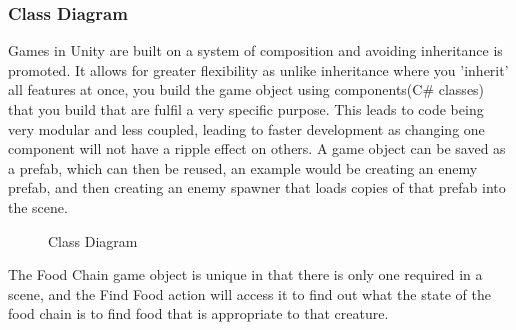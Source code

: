 \documentclass[10pt]{report}
\begin{document}
\subsubsection{Class Diagram}
Games in Unity are built on a system of composition and avoiding inheritance is promoted. It allows for greater flexibility as unlike inheritance where you 'inherit' all features at once, you build the game object using components(C\# classes) that you build that are fulfil a very specific purpose. This leads to code being very modular and less coupled, leading to faster development as changing one component will not have a ripple effect on others. A game object can be saved as a prefab, which can then be reused, an example would be creating an enemy prefab, and then creating an enemy spawner that loads copies of that prefab into the scene.

\begin{figure}[H]
    \centering
    \caption{Class Diagram}
\end{figure}

The Food Chain game object is unique in that there is only one required in a scene, and the Find Food action will access it to find out what the state of the food chain is to find food that is appropriate to that creature.
\end{document}

